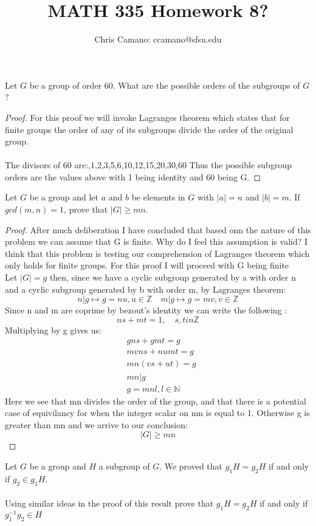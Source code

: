 \documentclass[11pt]{article}
\author{Chris Camano: ccamano@sfsu.edu}
\title{MATH 335  Homework 8? }
\date
\theoremstyle{definition}  %
\newcommand{\Z}{\mathbb{Z}}
\newcommand{\N}{\mathbb{N}}
\newcommand{\block}[2]{\begin{tcolorbox}[title={#1}]{#2}\end{tcolorbox}}
\begin{document}
\maketitle
 \block{Question #1}{Let $G$ be a group of order $60$. What are the possible orders of the subgroups of $G$ ?}
 \begin{proof}
   For this proof we will invoke Lagranges theorem which states that for finite groups the order of any of its subgroups divide the order of the original group.\\\\
   The divisors of 60 are:,1,2,3,5,6,10,12,15,20,30,60
   Thus the possible subgroup orders are the values above with 1 being identity and 60 being G.
 \end{proof}
 \block{Question #2}{ Let $G$ be a group and let $a$ and $b$ be elements in $G$ with $|a| = n$ and $|b| = m$. If $gcd(m,n) = 1$, prove that $|G| \geq mn$. }
 \begin{proof}
   After much deliberation I have concluded that based onn the nature of this problem we can assume that G is finite. Why do I feel this assumption is valid? I think that this problem is testing our comprehension of Lagranges theorem which only holds for finite groups. For this proof I will proceed with G being finite \\
   Let $|G|=g$ then, since we have a cyclic subgroup generated by a with order n and a cyclic subgroup generated by b with order m, by Lagranges theorem:
   \[
     n|g\mapsto g=nu, u \in \Z \quad m|g\mapsto g=mv, v\in \Z
   \]
   Since n and m are coprime by bezout's identity we can write the following :
   \[
     ns+mt=1, \quad s,t in \Z
   \]
   Multiplying by g gives us:
   \begin{align*}
     & gns+gmt=g\\
     &mvns+numt=g\\
     &mn(vs+ut)=g\\
     &mn|g\\
     &g=mnl, l \in \N
   \end{align*}
   Here we see that mn divides the order of the group, and that there is a potential case of equivilancy for when the integer scalar on mn is equal to 1. Otherwise g is greater than mn and we arrive to our conclusion: \[
     |G|\geq mn
   \]
 \end{proof}
 \block{Question #3}{ Let $G$ be a group and $H$ a subgroup of $G$. We proved that $g_1H = g_2H$ if and only if $g_2 \in g_1H$. \\\\Using similar ideas in the
  proof of this result prove that $g_1H = g_2H$ if and only if $g_1^{-1}g_2 \in H$}
\end{document}
